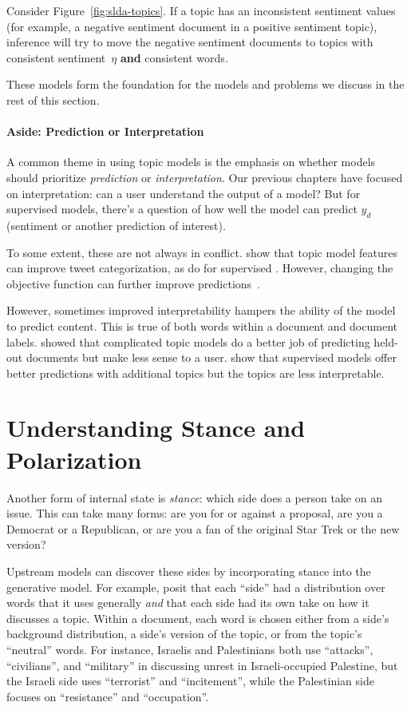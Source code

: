 Consider Figure~\ref{fig:slda-topics}.  If a topic has an inconsistent
sentiment values (for example, a negative sentiment document in a
positive sentiment topic), inference will try to move the negative
sentiment documents to topics with consistent sentiment~$\eta$ {\bf
  and} consistent words.  

These models form the foundation for the models and problems we
discuss in the rest of this section.

\paragraph{Aside: Prediction or Interpretation}

A common theme in using topic models is the emphasis on whether models
should prioritize \emph{prediction} or \emph{interpretation}.  Our
previous chapters have focused on interpretation: can a user
understand the output of a model?  But for supervised models, there's
a question of how well the model can predict $y_d$ (sentiment or
another prediction of interest).  

To some extent, these are not always in conflict.  \citet{ramage-10b}
show that topic model features can improve tweet categorization, as
do \citet{blei-07b} for supervised .  However, changing the
objective function can further improve predictions~\citep{zhu-09}.

However, sometimes improved interpretability hampers the ability of
the model to predict content.  This is true of both words within a
document and document labels.  \citet{chang-09b} showed that
complicated topic models do a better job of predicting held-out
documents but make less sense to a user.  \citet{Nguyen-15:anchor}
show that supervised models offer better predictions with additional
topics but the topics are less interpretable.

\section{Understanding Stance and Polarization}

Another form of internal state is \emph{stance}: which side does a
person take on an issue.  This can take many forms: are you for or
against a proposal, are you a Democrat or a Republican, or are you a
fan of the original Star Trek or the new version?

Upstream models can discover these sides by incorporating stance into
the generative model.  For example, \citet{paul-10} posit that each
``side'' had a distribution over words that it uses generally
\emph{and} that each side had its own take on how it discusses a
topic.  Within a document, each word is chosen either from a side's
background distribution, a side's version of the topic, or from the
topic's ``neutral'' words.  For instance, Israelis and Palestinians
both use ``attacks'', ``civilians'', and ``military'' in discussing
unrest in Israeli-occupied Palestine, but the Israeli side uses
``terrorist'' and ``incitement'', while the Palestinian side focuses
on ``resistance'' and ``occupation''.

